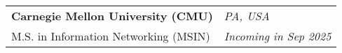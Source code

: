 \begin{tabularx}{\linewidth}{@{}l >{\raggedleft\arraybackslash}X@{}}
    \textbf{Carnegie Mellon University (CMU)} & \textit{PA, USA} \\
    M.S. in Information Networking (MSIN) & \textit{Incoming in Sep 2025} \\
\end{tabularx}